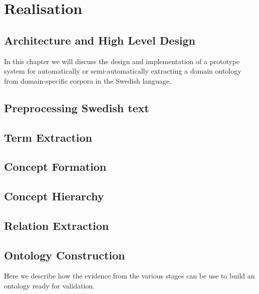 \documentclass[a4paper]{report}
\begin{document}
\chapter{Realisation}

\section{Architecture and High Level Design}

In this chapter we will discuss the design and implementation of a prototype system for automatically or semi-automatically extracting a domain ontology from domain-specific corpora in the Swedish language.

\section{Preprocessing Swedish text}

\section{Term Extraction}

\section{Concept Formation}

\section{Concept Hierarchy}

\section{Relation Extraction}

\section{Ontology Construction}

Here we describe how the evidence from the various stages can be use to build an ontology ready for validation.
\end{document}
